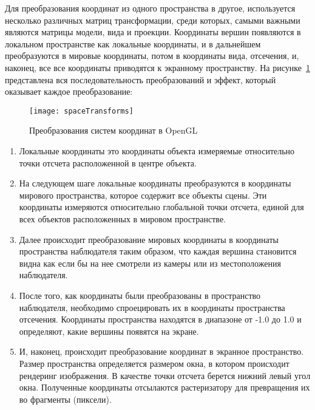 Для преобразования координат из одного пространства в другое, используется
несколько различных матриц трансформации, среди которых, самыми важными являются
матрицы модели, вида и проекции. Координаты вершин появляются в локальном
пространстве как локальные координаты, и в дальнейшем преобразуются в мировые
координаты, потом в координаты вида, отсечения, и, наконец, все все координаты
приводятся к экранному пространству. На рисунке~\ref{fig:spaceTransforms}
представлена вся последовательность преобразований и эффект, который оказывает
каждое преобразование:
\begin{figure}[htb]
	\centering
	\texttt{[image: spaceTransforms]}
	\caption{Преобразования систем координат в OpenGL}%
    \label{fig:spaceTransforms}
\end{figure}
\begin{enumerate}
    \item Локальные координаты это координаты объекта измеряемые относительно
        точки отсчета расположенной в центре объекта.

    \item На следующем шаге локальные координаты преобразуются в координаты
        мирового пространства, которое содержит все объекты сцены. Эти
        координаты измеряются относительно глобальной точки отсчета, единой для
        всех объектов расположенных в мировом пространстве.

    \item Далее происходит преобразование мировых координаты в координаты
        пространства наблюдателя таким образом, что каждая вершина становится
        видна как если бы на нее смотрели из камеры или из местоположения
        наблюдателя.

    \item После того, как координаты были преобразованы в пространство
        наблюдателя, необходимо спроецировать их в координаты пространства
        отсечения. Координаты пространства находятся в диапазоне от -1.0 до 1.0
        и определяют, какие вершины появятся на экране.

    \item И, наконец, происходит преобразование координат в экранное
        пространство. Размер пространства определяется размером окна, в котором
        происходит рендеринг изображения. В качестве точки отсчета берется
        нижний левый угол окна. Полученные координаты отсылаются растеризатору
        для превращения их во фрагменты (пиксели).
\end{enumerate}


